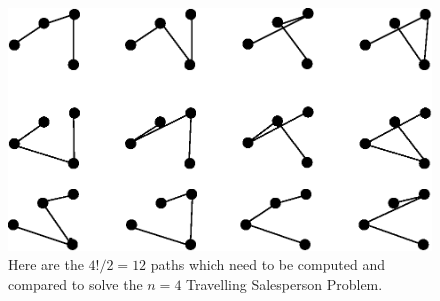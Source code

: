 \documentclass[11pt,a4paper]{scrartcl}
\begin{document}
\begin{figure}
\begin{center}
\includegraphics{travelling_sales.eps}
\end{center}
\caption{Here are the $4!/2=12$ paths which need to be computed and compared to solve the $n=4$ Travelling Salesperson Problem.}
\end{figure}
\end{document}
